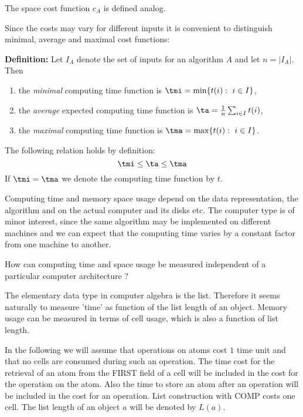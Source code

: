 The space cost function $c_A$ is defined analog.

Since the costs may vary for different inputs it is 
convenient to distinguish minimal, average and maximal
cost functions:

{\bf Definition:} Let $I_A$ denote the set of inputs 
for an algorithm $A$ and let $n = \vert I_A \vert$.
Then
\begin{enumerate}
\item the {\em minimal} computing time function is 
      $\tmi = \min\{ t(i) : \ i \in I \}$,
\item the {\em average} expected computing time function is
      $\ta  = \frac{1}{n} \sum_{i \in I} t(i) $, 
\item the {\em maximal} computing time function is 
      $\tma = \max\{ t(i) : \ i \in I \}$.
\end{enumerate}
The following relation holds by definition:
\begin{displaymath}
       \tmi \leq \ta \leq \tma
\end{displaymath}
If $\tmi = \tma$ we denote the 
computing time function by $t$.

Computing time and memory space usage depend on
the data representation, the algorithm and 
on the actual computer and its disks etc.
The computer type is of minor interest, since 
the same algorithm may be implemented on different machines
and we can expect that the computing time varies 
by a constant factor from one machine to another. 

How can computing time and space usage be
measured independent of a particular computer architecture ?

The elementary data type in computer algebra is the list.
Therefore it seems naturally to measure 'time' as 
function of the list length of an object.
Memory usage can be measured in terms of cell usage,
which is also a function of list length.

In the following we will assume that 
operations on atoms cost $1$ time unit and that 
no cells are consumed during such an operation.
The time cost for the retrieval of an atom from 
the FIRST field of a cell will be included in the
cost for the operation on the atom. Also the
time to store an atom after an operation will be included in 
the cost for an operation. 
List construction with COMP costs one cell.
The list length of an object $a$ will be denoted by $L(a)$.

